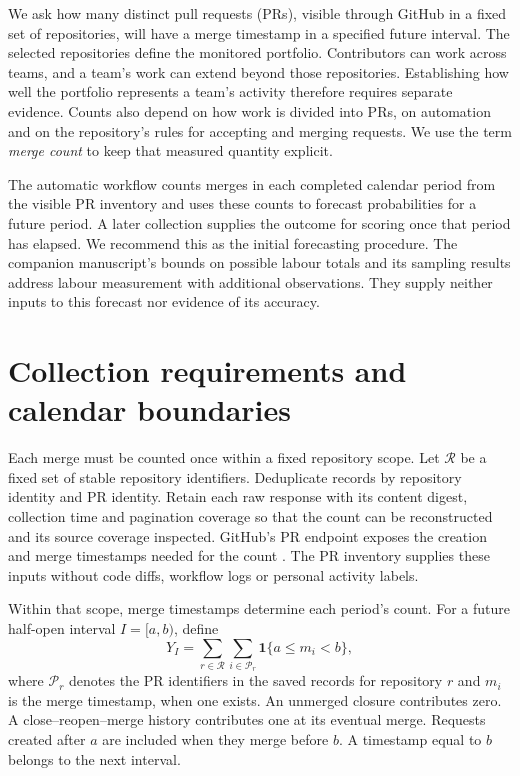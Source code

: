 \documentclass[11pt,a4paper]{article}
\newcommand{\ind}{\mathbf{1}}
\begin{document}
We ask how many distinct pull requests (PRs), visible through GitHub in a fixed set of repositories, will have a merge timestamp in a specified future interval. The selected repositories define the monitored portfolio. Contributors can work across teams, and a team's work can extend beyond those repositories. Establishing how well the portfolio represents a team's activity therefore requires separate evidence. Counts also depend on how work is divided into PRs, on automation and on the repository's rules for accepting and merging requests. We use the term \emph{merge count} to keep that measured quantity explicit.

The automatic workflow counts merges in each completed calendar period from the visible PR inventory and uses these counts to forecast probabilities for a future period. A later collection supplies the outcome for scoring once that period has elapsed. We recommend this as the initial forecasting procedure. The companion manuscript's bounds on possible labour totals and its sampling results address labour measurement with additional observations. They supply neither inputs to this forecast nor evidence of its accuracy.

\section{Collection requirements and calendar boundaries}
\label{sec:data}

Each merge must be counted once within a fixed repository scope. Let $\mathcal R$ be a fixed set of stable repository identifiers. Deduplicate records by repository identity and PR identity. Retain each raw response with its content digest, collection time and pagination coverage so that the count can be reconstructed and its source coverage inspected. GitHub's PR endpoint exposes the creation and merge timestamps needed for the count \citep{githubpulls}. The PR inventory supplies these inputs without code diffs, workflow logs or personal activity labels.

Within that scope, merge timestamps determine each period's count. For a future half-open interval $I=[a,b)$, define
\begin{equation}
 Y_I=\sum_{r\in\mathcal R}\sum_{i\in\mathcal P_r}
       \ind\{a\leq m_i<b\},
 \label{eq:count}
\end{equation}
where $\mathcal P_r$ denotes the PR identifiers in the saved records for repository $r$ and $m_i$ is the merge timestamp, when one exists. An unmerged closure contributes zero. A close--reopen--merge history contributes one at its eventual merge. Requests created after $a$ are included when they merge before $b$. A timestamp equal to $b$ belongs to the next interval.
\end{document}
